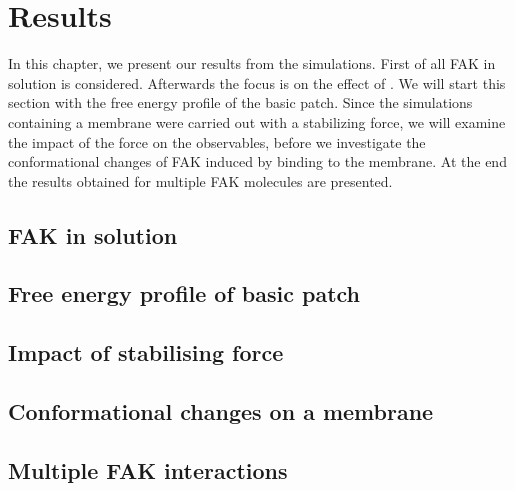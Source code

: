 \chapter{Results}
In this chapter, we present our results from the simulations. First of all FAK in solution is considered. Afterwards the focus is on the effect of \pip{}. We will start this section with the free energy profile of the basic patch. Since the simulations containing a membrane were carried out with a stabilizing force, we will examine the impact of the force on the observables, before we investigate the conformational changes of FAK induced by binding to the membrane. At the end the results obtained for multiple FAK molecules are presented.
%
%
\section{FAK in solution}

\clearpage
%
%
\section{Free energy profile of basic patch}

\clearpage
%
%
\section{Impact of stabilising force}

\clearpage
%
%
\section{Conformational changes on a membrane}

\clearpage
%
%
\section{Multiple FAK interactions}
